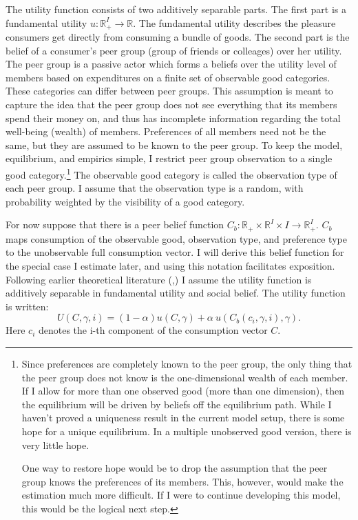 \documentclass{article}
\begin{document}
The utility function consists of two additively separable parts.  The first part is a fundamental utility $u:\mathbb{R}_+^{I}\rightarrow\mathbb{R}$.
The fundamental utility describes the pleasure consumers get directly from consuming a bundle of goods.
The second part is the belief of a consumer's peer group (group of friends or colleages) over her utility.
The peer group is a passive actor which forms a beliefs over the utility level of members based on expenditures on a finite set of observable good categories.
These categories can differ between peer groups.
This assumption is meant to capture the idea that the peer group does not see everything that its members spend their money on, and thus has incomplete information regarding the total well-being (wealth) of members.
Preferences of all members need not be the same, but they are assumed to be known to the peer group.
To keep the model, equilibrium, and empirics simple, I restrict peer group observation to a single good category.\footnote{Since preferences are completely known to the peer group, the only thing that the peer group does not know is the one-dimensional wealth of each member.  If I allow for more than one observed good (more than one dimension), then the equilibrium will be driven by beliefs off the equilibrium path. While I haven't proved a uniqueness result in the current model setup, there is some hope for a unique equilibrium.  In a multiple unobserved good version, there is very little hope.  

One way to restore hope would be to drop the assumption that the peer group knows the preferences of its members.  This, however, would make the estimation much more difficult.  If I were to continue developing this model, this would be the logical next step.}
The observable good category is called the observation type of each peer group.
I assume that the observation type is a random, with probability weighted by the visibility of a good category.

For now suppose that there is a peer belief function $C_b: \mathbb{R}_+\times\mathbb{R}^{I}\times I\rightarrow \mathbb{R}_+^{I}$.  $C_b$ maps consumption of the observable good, observation type, and preference type to the unobservable full consumption vector.
I will derive this belief function for the special case I estimate later, and using this notation facilitates exposition.
Following earlier theoretical literature (\citet{Heffetz2011},\citet{Ireland1994}) I assume the utility function is additively separable in fundamental utility and social belief.
The utility function is written:
\[U(C,\gamma,i) = (1-\alpha) u(C,\gamma) + \alpha\  u(C_b(c_i,\gamma,i),\gamma).\]
Here $c_i$ denotes the i-th component of the consumption vector $C$.
\end{document}
